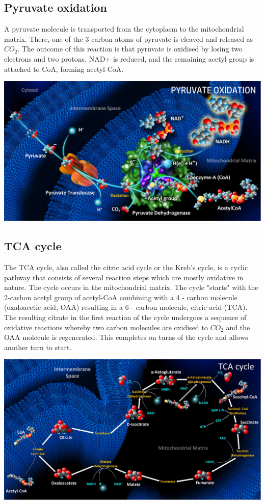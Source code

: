 \documentclass[11pt]{article}
\begin{document}
\newpage
\subsection{Pyruvate oxidation}
\label{sec:org318d2e5}
A pyruvate molecule is transported from the cytoplasm to the mitochondrial matrix. There, one of the 3 carbon atoms of pyruvate is cleaved and released as \(CO_2\). The outcome of this reaction is that pyruvate is oxidised by losing two electrons and two protons. NAD+ is reduced, and the remaining acetyl group is attached to CoA, forming acetyl-CoA.
\begin{center}
\includegraphics[width=.9\linewidth]{./images/pyruvate-oxidation.png}
\end{center}

\newpage
\subsection{TCA cycle}
\label{sec:org8cece91}
The TCA cycle, also called the citric acid cycle or the Kreb's cycle, is a cyclic pathway that consists of several reaction steps which are mostly oxidative in nature. The cycle occurs in the mitochondrial matrix. The cycle "starts" with the 2-carbon acetyl group of acetyl-CoA combining with a 4 - carbon molecule (oxaloacetic acid, OAA) resulting in a 6 - carbon molecule, citric acid (TCA). The resulting citrate in the first reaction of the cycle undergoes a sequence of oxidative reactions whereby two carbon molecules are oxidised to \(CO_2\) and the OAA molecule is regenerated. This completes on turns of the cycle and allows another turn to start.
\begin{center}
\includegraphics[width=.9\linewidth]{./images/tca-cycle.png}
\end{center}
\end{document}
